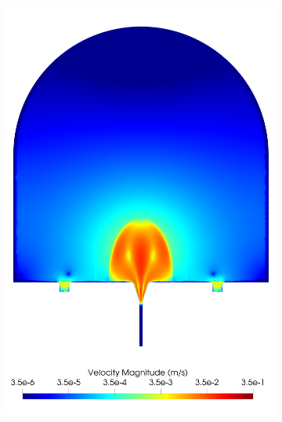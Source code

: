 \begin{figure}
\begin{subfigure}[b]{0.3\textwidth}
            \includegraphics[width=\textwidth]{diagrams/results-modelling/velocity-comparison/meshandsoln_dg_velocity_placentone_12_velocity-log.png}
            \caption{}
            \label{fig:4-models-placentone-norm-log:12}
        \end{subfigure}
        \hfill
        \begin{subfigure}[b]{0.3\textwidth}
            \centering

\end{subfigure}
\end{figure}
